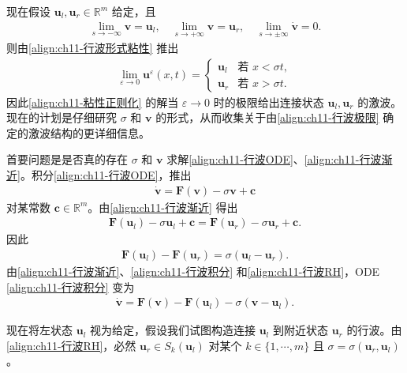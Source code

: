 \documentclass[../../main.tex]{subfiles}
\begin{document}
现在假设 $\mathbf{u}_l,\mathbf{u}_r\in\mathbb{R}^m$ 给定，且
\begin{align}
\lim_{s\to-\infty}\mathbf{v}=\mathbf{u}_l,\quad \lim_{s\to+\infty}\mathbf{v}=\mathbf{u}_r,\quad \lim_{s\to\pm\infty}\dot{\mathbf{v}}=0.
\label{align:ch11-行波渐近}
\end{align}
则由\eqref{align:ch11-行波形式粘性} 推出
\begin{align}
\lim_{\varepsilon\to 0}\mathbf{u}^\varepsilon(x,t)=
\begin{cases}
\mathbf{u}_l & \text{若 } x<\sigma t,\\
\mathbf{u}_r & \text{若 } x>\sigma t.
\end{cases}
\label{align:ch11-行波极限}
\end{align}
因此\eqref{align:ch11-粘性正则化} 的解当 $\varepsilon\to 0$ 时的极限给出连接状态 $\mathbf{u}_l,\mathbf{u}_r$ 的激波。现在的计划是仔细研究 $\sigma$ 和 $\mathbf{v}$ 的形式，从而收集关于由\eqref{align:ch11-行波极限} 确定的激波结构的更详细信息。

首要问题是是否真的存在 $\sigma$ 和 $\mathbf{v}$ 求解\eqref{align:ch11-行波ODE}、\eqref{align:ch11-行波渐近}。积分\eqref{align:ch11-行波ODE}，推出
\begin{align}
\dot{\mathbf{v}}=\mathbf{F}(\mathbf{v})-\sigma\mathbf{v}+\mathbf{c}
\label{align:ch11-行波积分}
\end{align}
对某常数 $\mathbf{c}\in\mathbb{R}^m$。由\eqref{align:ch11-行波渐近} 得出
\begin{align*}
\mathbf{F}(\mathbf{u}_l)-\sigma\mathbf{u}_l+\mathbf{c}=\mathbf{F}(\mathbf{u}_r)-\sigma\mathbf{u}_r+\mathbf{c}.
\end{align*}
因此
\begin{align}
\mathbf{F}(\mathbf{u}_l)-\mathbf{F}(\mathbf{u}_r)=\sigma(\mathbf{u}_l-\mathbf{u}_r).
\label{align:ch11-行波RH}
\end{align}
由\eqref{align:ch11-行波渐近}、\eqref{align:ch11-行波积分} 和\eqref{align:ch11-行波RH}，ODE \eqref{align:ch11-行波积分} 变为
\begin{align}
\dot{\mathbf{v}}=\mathbf{F}(\mathbf{v})-\mathbf{F}(\mathbf{u}_l)-\sigma(\mathbf{v}-\mathbf{u}_l).
\label{align:ch11-行波ODE2}
\end{align}

现在将左状态 $\mathbf{u}_l$ 视为给定，假设我们试图构造连接 $\mathbf{u}_l$ 到附近状态 $\mathbf{u}_r$ 的行波。由\eqref{align:ch11-行波RH}，必然 $\mathbf{u}_r\in S_k(\mathbf{u}_l)$ 对某个 $k\in\{1,\cdots,m\}$ 且 $\sigma=\sigma(\mathbf{u}_r,\mathbf{u}_l)$。
\end{document}
